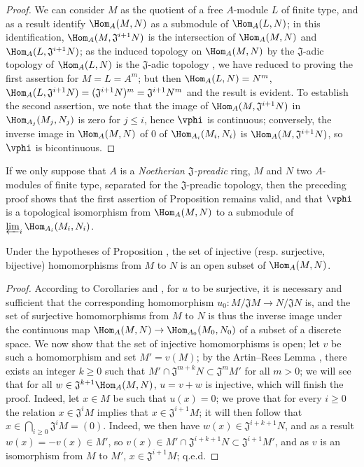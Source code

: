 \begin{proof}
We can consider $M$ as the quotient of a free $A$-module $L$ of finite type, and as a result identify $\Hom_A(M,N)$ as a submodule of $\Hom_A(L,N)$; in this identification,
$\Hom_A(M,\mathfrak{J}^{i+1}N)$ is the intersection of $\Hom_A(M,N)$ and
$\Hom_A(L,\mathfrak{J}^{i+1}N)$; as the induced topology on $\Hom_A(M,N)$ by the $\mathfrak{J}$-adic
topology of $\Hom_A(L,N)$ is the $\mathfrak{J}$-adic topology , we have
reduced to proving the first assertion
for $M=L=A^m$; but then $\Hom_A(L,N)=N^m$,
$\Hom_A(L,\mathfrak{J}^{i+1}N)=(\mathfrak{J}^{i+1}N)^m=\mathfrak{J}^{i+1}N^m$ and the result is
evident. To establish the second assertion, we note that the image of $\Hom_A(M,\mathfrak{J}^{i+1}N)$
in $\Hom_{A_j}(M_j,N_j)$ is zero for $j\leq i$, hence $\vphi$ is continuous; conversely, the
inverse image in $\Hom_A(M,N)$ of $0$ of $\Hom_{A_i}(M_i,N_i)$ is $\Hom_A(M,\mathfrak{J}^{i+1}N)$,
so $\vphi$ is bicontinuous.
\end{proof}

If we only suppose that $A$ is a \emph{Noetherian $\mathfrak{J}$-preadic} ring, $M$ and $N$ two
$A$-modules of finite type, separated for the $\mathfrak{J}$-preadic topology, then the
preceding proof shows that the first assertion of Proposition  remains
valid, and that $\vphi$ is a topological isomorphism from $\Hom_A(M,N)$ to a submodule of
$\varprojlim_i\Hom_{A_i}(M_i,N_i)$.

\begin{proposition}[7.8.3]
\label{0.7.8.3}
Under the hypotheses of Proposition , the set of injective
(resp. surjective, bijective) homomorphisms from $M$ to $N$ is an open subset of $\Hom_A(M,N)$.
\end{proposition}

\begin{proof}
According to Corollaries  and , for
$u$ to be surjective, it is necessary and sufficient that the corresponding homomorphism
$u_0:M/\mathfrak{J}M\to N/\mathfrak{J}N$ is, and the set of surjective homomorphisms from $M$ to $N$
is thus the inverse image under the continuous map $\Hom_A(M,N)\to\Hom_{A_0}(M_0,N_0)$ of a subset
of a discrete space. We now show that the set of injective homomorphisms is open; let $v$ be such a
homomorphism and set $M'=v(M)$; by the Artin--Rees Lemma , there exists
an integer $k\geq 0$ such that $M'\cap\mathfrak{J}^{m+k}N\subset\mathfrak{J}^m M'$ for all
$m>0$; we will see that for all $w\in\mathfrak{J}^{k+1}\Hom_A(M,N)$, $u=v+w$ is injective, which
will finish the proof. Indeed, let $x\in M$ be such that $u(x)=0$; we prove that for every
$i\geq 0$ the relation $x\in\mathfrak{J}^i M$ implies that $x\in\mathfrak{J}^{i+1}M$; it
will then follow that $x\in\bigcap_{i\geq 0}\mathfrak{J}^i M=(0)$. Indeed, we then have
$w(x)\in\mathfrak{J}^{i+k+1}N$, and as a result $w(x)=-v(x)\in M'$, so
$v(x)\in M'\cap\mathfrak{J}^{i+k+1}N\subset\mathfrak{J}^{i+1}M'$, and as $v$ is an isomorphism from
$M$ to $M'$, $x\in\mathfrak{J}^{i+1}M$; q.e.d.
\end{proof}
